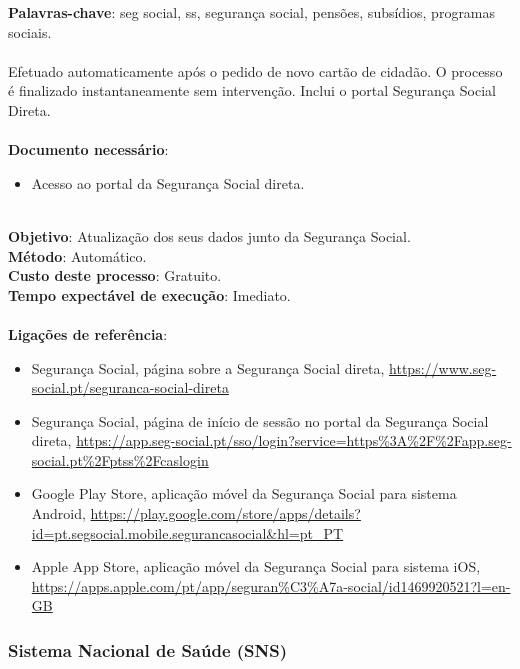 \textbf{Palavras-chave}: seg social, ss, segurança social, pensões, subsídios, programas sociais. \\
\\
Efetuado automaticamente após o pedido de novo cartão de cidadão. O
processo é finalizado instantaneamente sem intervenção. Inclui o portal
Segurança Social Direta. \\
\\
\textbf{Documento necessário}:
\begin{itemize}
	\item Acesso ao portal da Segurança Social direta.
\end{itemize}
\leavevmode\\
\textbf{Objetivo}: Atualização dos seus dados junto da Segurança Social. \\
\textbf{Método}: Automático. \\
\textbf{Custo deste processo}: Gratuito. \\
\textbf{Tempo expectável de execução}: Imediato. \\
\\
\textbf{Ligações de referência}:
\begin{itemize}
	\item Segurança Social, página sobre a Segurança Social direta, \url{https://www.seg-social.pt/seguranca-social-direta}
	\item Segurança Social, página de início de sessão no portal da Segurança Social direta, \url{https://app.seg-social.pt/sso/login?service=https\%3A\%2F\%2Fapp.seg-social.pt\%2Fptss\%2Fcaslogin}
	\item Google Play Store, aplicação móvel da Segurança Social para sistema Android, \url{https://play.google.com/store/apps/details?id=pt.segsocial.mobile.segurancasocial\&hl=pt\_PT}
	\item Apple App Store, aplicação móvel da Segurança Social para sistema iOS, \url{https://apps.apple.com/pt/app/seguran\%C3\%A7a-social/id1469920521?l=en-GB}
\end{itemize}

\subsubsection{Sistema Nacional de Saúde (SNS)}

